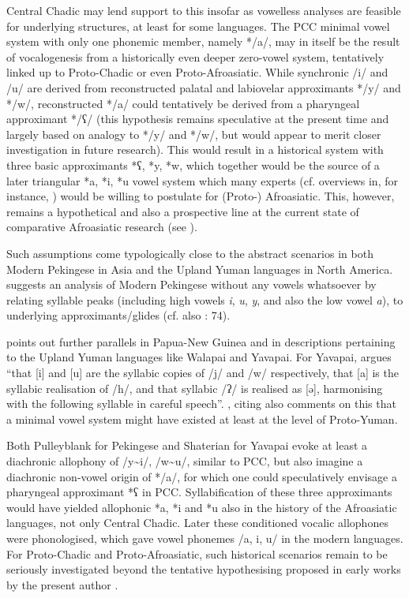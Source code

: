 \documentclass[output=paper]{langscibook}
\begin{document}
Central Chadic may lend support to this insofar as vowelless analyses are feasible for underlying structures, at least for some languages. The PCC minimal vowel system with only one phonemic member, namely */a/, may in itself be the result of vocalogenesis from a historically even deeper zero-vowel system, tentatively linked up to Proto-Chadic or even Proto-Afroasiatic. While synchronic \mbox{/i/} and /u/ are derived from reconstructed palatal and labiovelar approximants \mbox{*/y/} and */w/, reconstructed */a/ could tentatively be derived from a pharyngeal approximant */ʕ/ (this hypothesis remains speculative at the present time and largely based on analogy to */y/ and */w/, but would appear to merit closer investigation in future research). This would result in a historical system with three basic approximants *ʕ, *y, *w, which together would be the source of a later triangular *a, *i, *u vowel system which many experts (cf. overviews in, for instance, \citealt{FrajzyngierShay2012, MeyerWolff2019}) would be willing to postulate for (Proto-) Afroasiatic. This, however, remains a hypothetical and also a prospective line at the current state of comparative Afroasiatic research (see ).

Such assumptions come typologically close to the abstract scenarios in both Modern Pekingese in Asia and the Upland Yuman languages in North America. \citet[57]{Pulleyblank1983} suggests an analysis of Modern Pekingese without any vowels whatsoever by relating syllable peaks (including high vowels \textit{i}, \textit{u}, \textit{y}, and also the low vowel \textit{a}), to underlying approximants/glides (cf. also \citealt{Anderson2016}: 74). 

\textcite[83, 85]{Anderson2016} points out further parallels in Papua-New Guinea and in descriptions pertaining to the Upland Yuman languages like Walapai and Yavapai. For Yavapai, \citet[130]{Shaterian1976} argues “that [i] and [u] are the syllabic copies of /j/ and /w/ respectively, that [a] is the syllabic realisation of /h/, and that syllabic /ʔ/ is realised as [ə], harmonising with the following syllable in careful speech”. \textcite[85ff.]{Anderson2016}, citing also \textcites[146]{Langdon1976}[97]{Langdon1996} comments on this that a minimal vowel system might have existed at least at the level of Proto-Yuman.

Both Pulleyblank for Pekingese and Shaterian for Yavapai evoke at least a diachronic allophony of /y{\textasciitilde}i/, /w{\textasciitilde}u/, similar to PCC, but also imagine a diachronic non-vowel origin of */a/, for which one could speculatively envisage a pharyngeal approximant *ʕ in PCC. Syllabification of these three approximants would have yielded allophonic *a, *i and *u also in the history of the Afroasiatic languages, not only Central Chadic. Later these conditioned vocalic allophones were phonologised, which gave vowel phonemes /a, i, u/ in the modern languages. For Proto-Chadic and Proto-Afroasiatic, such historical scenarios remain to be seriously investigated beyond the tentative hypothesising proposed in early works by the present author \parencite{Wolff1981, Wolff1983a}.
\end{document}
